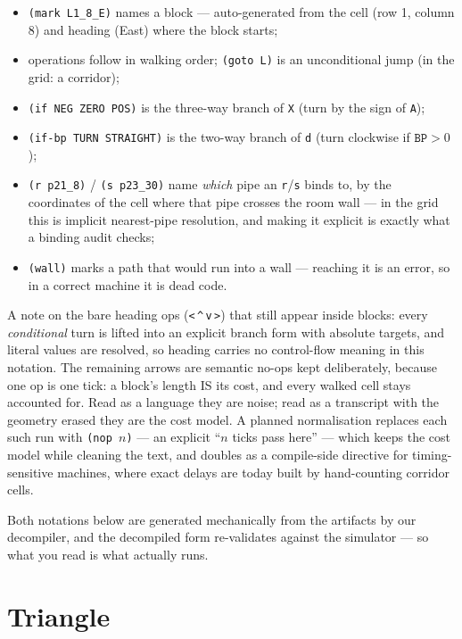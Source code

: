 \documentclass[11pt,a4paper]{article}
\newcommand{\op}[1]{\texttt{#1}}
\begin{document}
\begin{itemize}
  \item \texttt{(mark L1\_8\_E)} names a block --- auto-generated from the
        cell (row 1, column 8) and heading (East) where the block starts;
  \item operations follow in walking order; \texttt{(goto L)} is an
        unconditional jump (in the grid: a corridor);
  \item \texttt{(if NEG ZERO POS)} is the three-way branch of \op{X}
        (turn by the sign of \op{A});
  \item \texttt{(if-bp TURN STRAIGHT)} is the two-way branch of \op{d}
        (turn clockwise if $\op{BP}>0$);
  \item \texttt{(r p21\_8)} / \texttt{(s p23\_30)} name \emph{which} pipe an
        \op{r}/\op{s} binds to, by the coordinates of the cell where that
        pipe crosses the room wall --- in the grid this is implicit
        nearest-pipe resolution, and making it explicit is exactly what a
        binding audit checks;
  \item \texttt{(wall)} marks a path that would run into a wall --- reaching
        it is an error, so in a correct machine it is dead code.
\end{itemize}

A note on the bare heading ops (\op{<}\,\op{\^{}}\,\op{v}\,\op{>})
that still appear inside blocks: every \emph{conditional} turn is lifted
into an explicit branch form with absolute targets, and literal values are
resolved, so heading carries no control-flow meaning in this notation. The
remaining arrows are semantic no-ops kept deliberately, because one op is
one tick: a block's length IS its cost, and every walked cell stays
accounted for. Read as a language they are noise; read as a transcript with
the geometry erased they are the cost model. A planned normalisation
replaces each such run with \texttt{(nop $n$)} --- an explicit ``$n$ ticks
pass here'' --- which keeps the cost model while cleaning the text, and
doubles as a compile-side directive for timing-sensitive machines, where
exact delays are today built by hand-counting corridor cells.

Both notations below are generated mechanically from the artifacts by our
decompiler, and the decompiled form re-validates against the simulator ---
so what you read is what actually runs.

\clearpage
\section{Triangle}
\end{document}
